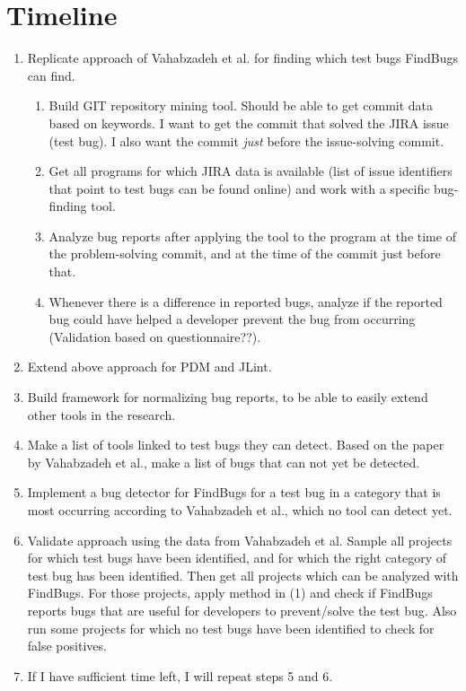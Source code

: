 \documentclass{uvamscse}
\newcommand{\Atestbugs}{Vahabzadeh et al.}
\begin{document}
\section{Timeline}
\label{sec:timeline}
\begin{enumerate}
	\item Replicate approach of \Atestbugs{} for finding which test bugs FindBugs can find. 
	\begin{enumerate}
		\item Build GIT repository mining tool. Should be able to get commit data based on keywords. I want to get the commit that solved the JIRA issue (test bug). I also want the commit \textit{just} before the issue-solving commit. 
		\item Get all programs for which JIRA data is available (list of issue identifiers that point to test bugs can be found online) and work with a specific bug-finding tool. 
		\item Analyze bug reports after applying the tool to the program at the time of the problem-solving commit, and at the time of the commit just before that.
		\item Whenever there is a difference in reported bugs, analyze if the reported bug could have helped a developer prevent the bug from occurring (Validation based on questionnaire??).
	\end{enumerate}
	\item Extend above approach for PDM and JLint.
	\item Build framework for normalizing bug reports, to be able to easily extend other tools in the research.
	\item Make a list of tools linked to test bugs they can detect. Based on the paper by \Atestbugs{}, make a list of bugs that can not yet be detected. 
	\item Implement a bug detector for FindBugs for a test bug in a category that is most occurring according to \Atestbugs{}, which no tool can detect yet.
	\item Validate approach using the data from \Atestbugs{} Sample all projects for which test bugs have been identified, and for which the right category of test bug has been identified. Then get all projects which can be analyzed with FindBugs. For those projects, apply method in (1) and check if FindBugs reports bugs that are useful for developers to prevent/solve the test bug. Also run some projects for which no test bugs have been identified to check for false positives. 
	\item If I have sufficient time left, I will repeat steps 5 and 6. 
\end{enumerate}
\end{document}
